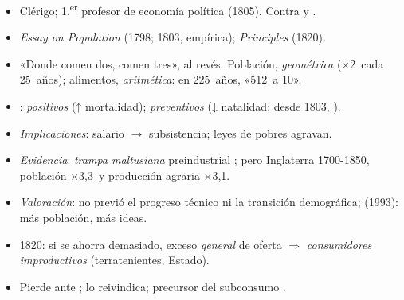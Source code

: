 \documentclass{article}
\begin{document}
\begin{columnas}
\begin{itemize}
\item Clérigo; 1.\textsuperscript{er} profesor de economía política (1805). Contra  y .
\item \emph{Essay on Population} (1798; 1803, empírica); \emph{Principles} (1820).
\end{itemize}
\begin{itemize}
\item «Donde comen dos, comen tres», al revés. Población, \emph{geométrica} (×2~cada 25~años); alimentos, \emph{aritmética}: en 225~años, «512~a 10».
\end{itemize}
\begin{itemize}
\item {}: \emph{positivos} (↑ mortalidad); \emph{preventivos} (↓ natalidad; desde 1803, ).
\item \emph{Implicaciones}: salario $\to$ subsistencia; leyes de pobres agravan.
\item \emph{Evidencia}: \emph{trampa maltusiana} preindustrial ; pero Inglaterra 1700-1850, población ×3,3~y producción agraria ×3,1.
\item \emph{Valoración}: no previó el progreso técnico  ni la transición demográfica;  (1993): más población, más ideas.
\end{itemize}
\begin{itemize}
\item 1820: si se ahorra demasiado, exceso \emph{general} de oferta $\Rightarrow$ \emph{consumidores improductivos} (terratenientes, Estado).
\item Pierde ante ;  lo reivindica; precursor del subconsumo .
\end{itemize}


\end{columnas}
\end{document}
